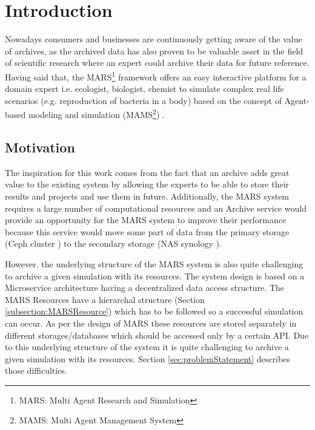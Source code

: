 \newpage
    \chapter{Introduction}
    Nowadays consumers and businesses are continuously getting aware of the value of archives, as the archived data has also proven
    to be valuable asset in the field of scientific research where an expert could archive their data for future reference. Having said that, the 
    MARS\footnote{MARS: Multi Agent Research and Simulation} framework offers an easy interactive platform for a domain expert i.e. ecologist, biologist, 
    chemist to simulate complex real life scenarios (e.g. reproduction of bacteria in a body) based on the concept of Agent-based modeling and simulation 
    (MAMS\footnote{MAMS: Multi Agent Management System}) \cite{agentModeling}.

        \section{Motivation}
        The inspiration for this work comes from the fact that an archive adds great value to the existing system by allowing the experts to be
        able to store their results and projects and use them in future. Additionally, the MARS system requires a large number of computational resources and
        an Archive service would provide an opportunity for the MARS system to improve their
        performance because this service would move some part of data from the primary storage (Ceph cluster \cite{Ceph}) to the secondary storage (NAS synology \cite{Synology}). 

        However, the underlying structure of the MARS system is also quite
        challenging to archive a given simulation with its resources.
        The system design is based on a Microservice architecture \cite{MicroserviceNewMan} having a decentralized data \cite{atomic} access structure. 
        The MARS Resources have a hierarchal
        structure (Section \ref{subsection:MARSResource}) which has to be followed so a successful simulation can occur. As per the design of MARS these resources
        are stored separately in different storages/databases which should be accessed only by a certain API. Due to this underlying structure of the system it is quite 
        challenging to archive a given simulation with its resources. Section
        \ref{sec:problemStatement} describes those difficulties.  

